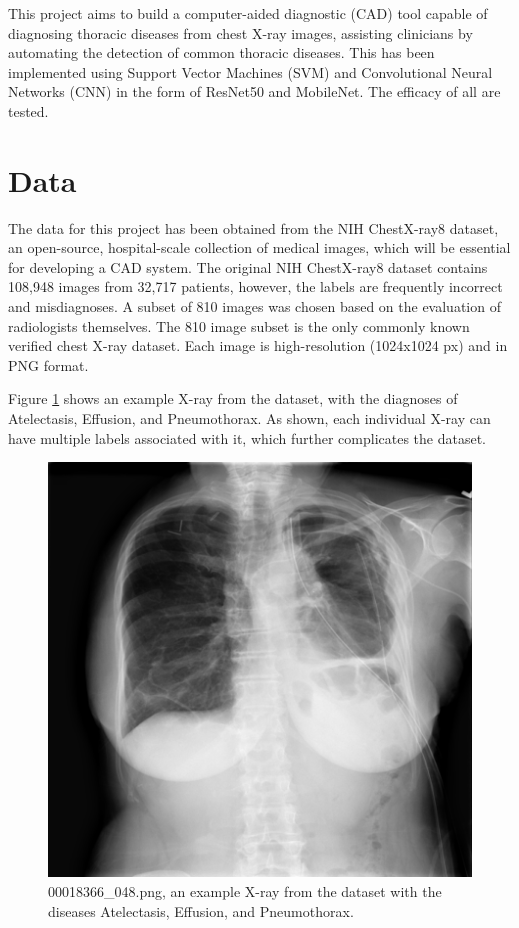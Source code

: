 \documentclass{article}
\theoremstyle{plain}
\theoremstyle{definition}
\theoremstyle{remark}
\begin{document}
This project aims to build a computer-aided diagnostic (CAD) tool capable of diagnosing thoracic
diseases from chest X-ray images, assisting clinicians by automating the detection of common thoracic
diseases. This has been implemented using Support Vector Machines (SVM) and Convolutional Neural Networks
(CNN) in the form of ResNet50 and MobileNet. The efficacy of all are tested.


\section{Data}
The data for this project has been obtained from the NIH ChestX-ray8 dataset, an open-source,
hospital-scale collection of medical images, which will be essential for developing a CAD system.
The original NIH ChestX-ray8 dataset contains 108,948 images from 32,717 patients, however, the
labels are frequently incorrect and misdiagnoses.
A subset of 810 images was chosen based on the evaluation of radiologists themselves. The 810 image
subset is the only commonly known verified chest X-ray dataset. Each image is high-resolution
(1024x1024 px) and in PNG format.

Figure \ref{fig:examplexray} shows an example X-ray from the dataset, with the diagnoses of
Atelectasis, Effusion, and Pneumothorax. As shown, each individual X-ray can have multiple labels
associated with it, which further complicates the dataset.

\begin{figure}[!h]
    \centering
    \includegraphics[scale=0.5]{00018366_048}
    \caption{00018366\_048.png, an example X-ray from the dataset with the diseases Atelectasis,
    Effusion, and Pneumothorax.}
    \label{fig:examplexray}
\end{figure}
\end{document}
